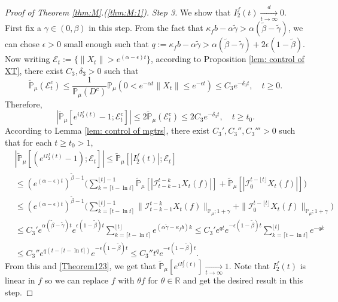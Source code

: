 \documentclass[12pt,a4paper]{amsart}
\theoremstyle{plain}
\theoremstyle{definition}
\numberwithin{equation}{section}
\begin{document}
\begin{proof}[Proof of Theorem \ref{thm:M}.(\ref{thm:M:1})]
  \emph{Step 3.}
  We show that $I^f_2(t)\xrightarrow[t\to \infty]{d} 0$.
  First fix a $\gamma \in (0,\beta)$ in this step. 
  From the fact that $\kappa_f b -\alpha \tilde \gamma > \alpha (\tilde \beta - \tilde \gamma)$, we can chose $\epsilon >0$ small enough such that $q:=\kappa_fb- \alpha \tilde \gamma  > \alpha (\tilde \beta - \tilde \gamma) + 2\epsilon (1 - \tilde \beta)$.
  Now writing $\mathcal{E}_t:=\{\|X_t\|>e^{(\alpha-\epsilon) t}\}$, according to Proposition \ref{lem: control of XT}, there exist $C_3, \delta_3>0$ such that
  \begin{equation}
    \mathbb{\widetilde{P}}_{\mu}(\mathcal{E}^c_t)
    \leq \frac{1}{\mathbb{P}_{\mu}(D^c)}\mathbb{P}_{\mu}(0<e^{-\alpha t}\|X_t\|\leq e^{-\epsilon t})\leq C_3e^{-\delta_3 t}
    , \quad t\geq0.
  \end{equation}
  Therefore,
  \begin{equation}
    \label{Theorem123}
    |\mathbb{\widetilde{P}}_{\mu}[e^{i I^f_2(t)}-1;\mathcal{E}^c_t]|
    \leq 2\mathbb{\widetilde{P}}_{\mu}(\mathcal{E}^c_t)
    \leq 2C_3e^{-\delta_3 t},
    \quad t\geq t_0.
  \end{equation}
	According to Lemma \ref{lem: control of mgtrs}, there exist $C_3',C_3'',C_3'''>0$ such that for each $t\geq t_0 >1$, 
  \begin{align}
    & |\mathbb{\widetilde{P}}_{\mu} [ (e^{i I^f_2(t)}-1);\mathcal{E}_t]|
      \leq  \mathbb{\widetilde{P}}_{\mu} [ |I^f_2(t)|;\mathcal{E}_t] \\
    & \leq  ( e^{(\alpha-\epsilon) t} )^{\tilde \beta - 1}\Big(\sum_{k=\lceil t-\ln t \rceil}^{\lfloor t \rfloor - 1}\mathbb{\widetilde{P}}_{\mu} [| \mathcal{I}_{t-k-1}^{t-k} X_t(f) |] + \mathbb{\widetilde{P}}_{\mu}[| \mathcal{I}_{0}^{t-\lfloor t\rfloor} X_t(f)|]\Big) \\
    & \leq ( e^{(\alpha-\epsilon) t} )^{\tilde \beta - 1}\Big(\sum_{k=\lceil t-\ln t \rceil}^{\lfloor t \rfloor - 1}\|\mathcal{I}_{t-k-1}^{t-k} X_t(f) \|_{\mathbb P_\mu; 1+\gamma} + \|\mathcal I_0^{t-\lfloor t \rfloor} X_t(f)\|_{\mathbb P_\mu;1+\gamma}\Big) \\ 
    & \leq C_3' e^{\alpha (\tilde \beta - \tilde \gamma)t} e ^{\epsilon (1-\tilde \beta) t}\sum_{k=\lceil t-\ln t \rceil}^{\lfloor t \rfloor}  e^{(\alpha\tilde \gamma-\kappa_f b)k}
      \leq C_3' e^{q t}e^{-\epsilon ( 1 - \tilde \beta)t}\sum_{k=\lceil t-\ln t \rceil}^{\lfloor t \rfloor}  e^{-q k}
\\ 
    & \leq C_3'' e^{q(t - \lceil t - \ln t\rceil)}e^{-\epsilon(1 - \tilde \beta) t}
\leq C_3'' t^q e^{- \epsilon(1 - \tilde \beta) t}.
  \end{align}
  From this and \eqref{Theorem123}, we get that $\widetilde {\mathbb P}_\mu[e^{i I^f_2(t)}] \xrightarrow[t\to \infty]{} 1$. 
  Note that $I^f_2(t)$ is linear in $f$ so we can replace $f$ with $\theta f$ for $\theta \in \mathbb R$ and get the desired result in this step.


\end{proof}
\end{document}
